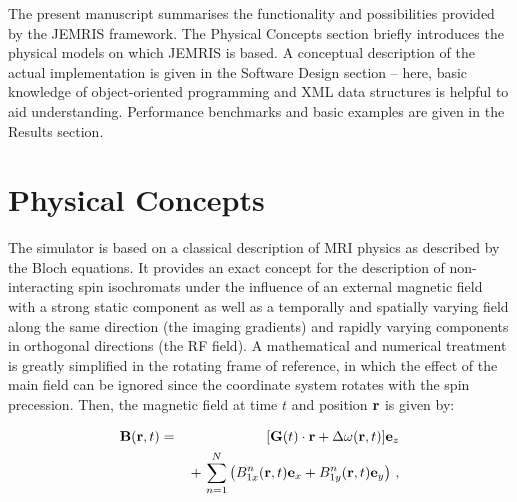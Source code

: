 \documentclass[journal,onecolumn,12pt]{IEEEtran}
\begin{document}
The present manuscript summarises the functionality and possibilities provided by the JEMRIS framework. The Physical
Concepts section briefly introduces the physical models on which JEMRIS is based. A conceptual description of the actual
implementation is given in the Software Design section -- here, basic knowledge of object-oriented programming and XML
data structures is helpful to aid understanding. Performance benchmarks and basic examples are given in the Results section.



\section{Physical Concepts}

The simulator is based on a classical description of MRI physics as described by the Bloch equations. It provides an
exact concept for the description of non-interacting spin isochromats under the influence of an external magnetic field
with a strong static component as well as a temporally and spatially varying field along the same direction (the imaging
gradients) and rapidly varying components in orthogonal directions (the RF field). A mathematical and numerical
treatment is greatly simplified in the rotating frame of reference, in which the effect of the main field can be ignored
since the coordinate system rotates with the spin precession. Then, the magnetic field at time $t$ and position ${\bf
  r}$ is given by:

\begin{eqnarray}
        {\bf B}({\bf r},t) & = & [{\bf G}(t)\cdot{\bf r}+\Delta\omega({\bf r},t)]{\bf e}_z \nonumber \\
                           &   & \,+\,\sum_{n=1}^{N}\left(B_{1x}^n({\bf r},t){\bf e}_x+B_{1y}^n({\bf r},t){\bf e}_y\right)\,, \label{eq:field}
\end{eqnarray}
\end{document}
